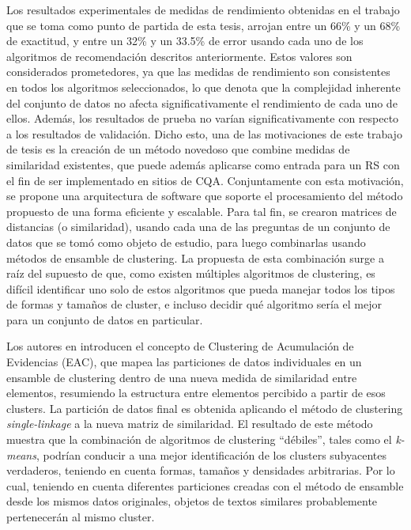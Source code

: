 \bigskip Los resultados experimentales de medidas de rendimiento obtenidas en el trabajo que se toma como punto de partida de esta tesis, arrojan entre un 66\% y un 68\% de exactitud, y entre un 32\% y un 33.5\% de error usando cada uno de los algoritmos de recomendación descritos anteriormente. Estos valores son considerados prometedores, ya que las medidas de rendimiento son consistentes en todos los algoritmos seleccionados, lo que denota que la complejidad inherente del conjunto de datos no afecta significativamente el rendimiento de cada uno de ellos. Además, los resultados de prueba no varían significativamente con respecto a los resultados de validación. Dicho esto, una de las motivaciones de este trabajo de tesis es la creación de un método novedoso que combine medidas de similaridad existentes, que puede además aplicarse como entrada para un RS con el fin de ser implementado en sitios de CQA. Conjuntamente con esta motivación, se propone una arquitectura de software que soporte el procesamiento del método propuesto de una forma eficiente y escalable. Para tal fin, se crearon matrices de distancias (o similaridad), usando cada una de las preguntas de un conjunto de datos que se tomó como objeto de estudio, para luego combinarlas usando métodos de ensamble de clustering. La propuesta de esta combinación surge a raíz del supuesto de que, como existen múltiples algoritmos de clustering, es difícil identificar uno solo de estos algoritmos que pueda manejar todos los tipos de formas y tamaños de cluster, e incluso decidir qué algoritmo sería el mejor para un conjunto de datos en particular.

\bigskip Los autores en \citep{fred2005combining} introducen el concepto de Clustering de Acumulación de Evidencias (EAC), que mapea las particiones de datos individuales en un ensamble de clustering dentro de una nueva medida de similaridad entre elementos, resumiendo la estructura entre elementos percibido a partir de esos clusters. La partición de datos final es obtenida aplicando el método de clustering \textit{single-linkage} a la nueva matriz de similaridad. El resultado de este método muestra que la combinación de algoritmos de clustering “débiles”, tales como el \textit{k-means}, podrían conducir a una mejor identificación de los clusters subyacentes verdaderos, teniendo en cuenta formas, tamaños y densidades arbitrarias. Por lo cual, teniendo en cuenta diferentes particiones creadas con el método de ensamble desde los mismos datos originales, objetos de textos similares probablemente pertenecerán al mismo cluster.

